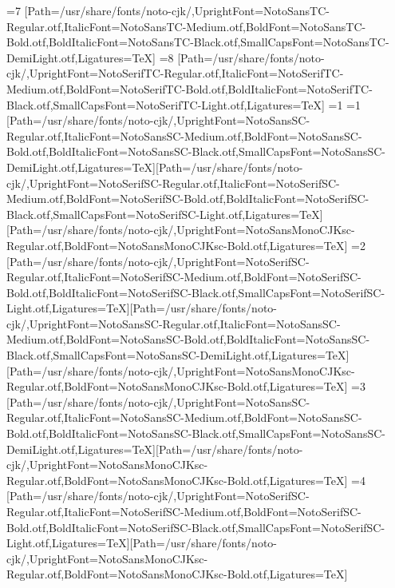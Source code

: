 \else\ifnum\value{CJKFonts}=7
[Path=/usr/share/fonts/noto-cjk/,UprightFont=NotoSansTC-Regular.otf,ItalicFont=NotoSansTC-Medium.otf,BoldFont=NotoSansTC-Bold.otf,BoldItalicFont=NotoSansTC-Black.otf,SmallCapsFont=NotoSansTC-DemiLight.otf,Ligatures=TeX]
\else\ifnum\value{CJKFonts}=8
[Path=/usr/share/fonts/noto-cjk/,UprightFont=NotoSerifTC-Regular.otf,ItalicFont=NotoSerifTC-Medium.otf,BoldFont=NotoSerifTC-Bold.otf,BoldItalicFont=NotoSerifTC-Black.otf,SmallCapsFont=NotoSerifTC-Light.otf,Ligatures=TeX]
\fi\fi\fi\fi\fi\fi\fi\fi\else
\ifnum\value{CJKLanguage}=1
\ifnum\value{CJKFonts}=1
[Path=/usr/share/fonts/noto-cjk/,UprightFont=NotoSansSC-Regular.otf,ItalicFont=NotoSansSC-Medium.otf,BoldFont=NotoSansSC-Bold.otf,BoldItalicFont=NotoSansSC-Black.otf,SmallCapsFont=NotoSansSC-DemiLight.otf,Ligatures=TeX][Path=/usr/share/fonts/noto-cjk/,UprightFont=NotoSerifSC-Regular.otf,ItalicFont=NotoSerifSC-Medium.otf,BoldFont=NotoSerifSC-Bold.otf,BoldItalicFont=NotoSerifSC-Black.otf,SmallCapsFont=NotoSerifSC-Light.otf,Ligatures=TeX][Path=/usr/share/fonts/noto-cjk/,UprightFont=NotoSansMonoCJKsc-Regular.otf,BoldFont=NotoSansMonoCJKsc-Bold.otf,Ligatures=TeX]
\else\ifnum\value{CJKFonts}=2
[Path=/usr/share/fonts/noto-cjk/,UprightFont=NotoSerifSC-Regular.otf,ItalicFont=NotoSerifSC-Medium.otf,BoldFont=NotoSerifSC-Bold.otf,BoldItalicFont=NotoSerifSC-Black.otf,SmallCapsFont=NotoSerifSC-Light.otf,Ligatures=TeX][Path=/usr/share/fonts/noto-cjk/,UprightFont=NotoSansSC-Regular.otf,ItalicFont=NotoSansSC-Medium.otf,BoldFont=NotoSansSC-Bold.otf,BoldItalicFont=NotoSansSC-Black.otf,SmallCapsFont=NotoSansSC-DemiLight.otf,Ligatures=TeX][Path=/usr/share/fonts/noto-cjk/,UprightFont=NotoSansMonoCJKsc-Regular.otf,BoldFont=NotoSansMonoCJKsc-Bold.otf,Ligatures=TeX]
\else\ifnum\value{CJKFonts}=3
[Path=/usr/share/fonts/noto-cjk/,UprightFont=NotoSansSC-Regular.otf,ItalicFont=NotoSansSC-Medium.otf,BoldFont=NotoSansSC-Bold.otf,BoldItalicFont=NotoSansSC-Black.otf,SmallCapsFont=NotoSansSC-DemiLight.otf,Ligatures=TeX][Path=/usr/share/fonts/noto-cjk/,UprightFont=NotoSansMonoCJKsc-Regular.otf,BoldFont=NotoSansMonoCJKsc-Bold.otf,Ligatures=TeX]
\else\ifnum\value{CJKFonts}=4
[Path=/usr/share/fonts/noto-cjk/,UprightFont=NotoSerifSC-Regular.otf,ItalicFont=NotoSerifSC-Medium.otf,BoldFont=NotoSerifSC-Bold.otf,BoldItalicFont=NotoSerifSC-Black.otf,SmallCapsFont=NotoSerifSC-Light.otf,Ligatures=TeX][Path=/usr/share/fonts/noto-cjk/,UprightFont=NotoSansMonoCJKsc-Regular.otf,BoldFont=NotoSansMonoCJKsc-Bold.otf,Ligatures=TeX]
